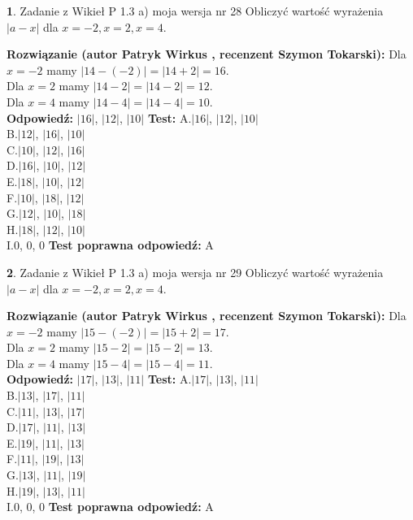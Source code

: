 \documentclass[12pt, a4paper]{article}
\theoremstyle{definition} %
\newtheorem{zad}{}
\newcommand{\zadStart}[1]{\begin{zad}#1\newline}
\newcommand{\zadStop}{\end{zad}}
\newcommand{\rozwStart}[2]{\noindent \textbf{Rozwiązanie (autor #1 , recenzent #2): }\newline}
\newcommand{\rozwStop}{\newline}
\newcommand{\odpStart}{\noindent \textbf{Odpowiedź:}\newline}
\newcommand{\odpStop}{\newline}
\newcommand{\testStart}{\noindent \textbf{Test:}\newline}
\newcommand{\testStop}{\newline}
\newcommand{\kluczStart}{\noindent \textbf{Test poprawna odpowiedź:}\newline}
\newcommand{\kluczStop}{\newline}
\begin{document}
\zadStart{Zadanie z Wikieł P 1.3 a) moja wersja nr 28}
Obliczyć wartość wyrażenia $|a - x|$ dla $x=-2,x=2,x=4$.
\zadStop
\rozwStart{Patryk Wirkus}{Szymon Tokarski}
Dla $x = -2$ mamy $|14 - (-2)| = |14 + 2| = 16$.\\
Dla $x = 2$ mamy $|14 - 2| = |14 - 2| = 12$.\\
Dla $x = 4$ mamy $|14 - 4| = |14 - 4| = 10$.\\
\rozwStop
\odpStart
$|16|$, $|12|$, $|10|$
\odpStop
\testStart
A.$|16|$, $|12|$, $|10|$\\
B.$|12|$, $|16|$, $|10|$\\
C.$|10|$, $|12|$, $|16|$\\
D.$|16|$, $|10|$, $|12|$\\
E.$|18|$, $|10|$, $|12|$\\
F.$|10|$, $|18|$, $|12|$\\
G.$|12|$, $|10|$, $|18|$\\
H.$|18|$, $|12|$, $|10|$\\
I.$0$, $0$, $0$
\testStop
\kluczStart
A
\kluczStop



\zadStart{Zadanie z Wikieł P 1.3 a) moja wersja nr 29}
Obliczyć wartość wyrażenia $|a - x|$ dla $x=-2,x=2,x=4$.
\zadStop
\rozwStart{Patryk Wirkus}{Szymon Tokarski}
Dla $x = -2$ mamy $|15 - (-2)| = |15 + 2| = 17$.\\
Dla $x = 2$ mamy $|15 - 2| = |15 - 2| = 13$.\\
Dla $x = 4$ mamy $|15 - 4| = |15 - 4| = 11$.\\
\rozwStop
\odpStart
$|17|$, $|13|$, $|11|$
\odpStop
\testStart
A.$|17|$, $|13|$, $|11|$\\
B.$|13|$, $|17|$, $|11|$\\
C.$|11|$, $|13|$, $|17|$\\
D.$|17|$, $|11|$, $|13|$\\
E.$|19|$, $|11|$, $|13|$\\
F.$|11|$, $|19|$, $|13|$\\
G.$|13|$, $|11|$, $|19|$\\
H.$|19|$, $|13|$, $|11|$\\
I.$0$, $0$, $0$
\testStop
\kluczStart
A
\kluczStop
\end{document}
